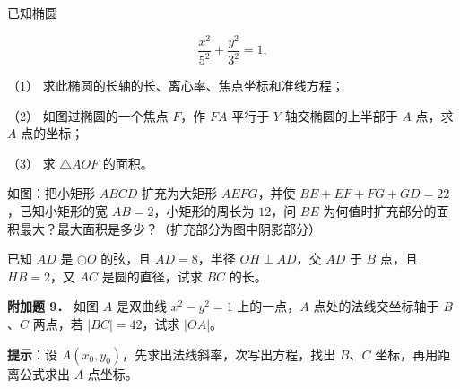 \begin{question}
已知椭圆

\nopagebreak[4]
\[
\frac{x^2}{5^2}+\frac{y^2}{3^2}=1,
\]

（1） 求此椭圆的长轴的长、离心率、焦点坐标和准线方程；

（2） 如图过椭圆的一个焦点 $F$，作 $FA$ 平行于 $Y$ 轴交椭圆的上半部于 $A$ 点，求 $A$ 点的坐标；
\nopagebreak[4]
\begin{center}\end{center}
\nopagebreak[4]
（3） 求 $\triangle AOF$ 的面积。

\Needspace{0.4\textheight}
\end{question}
\begin{question}
如图：把小矩形 $ABCD$ 扩充为大矩形 $AEFG$，并使 $BE+EF+FG+GD=22$，已知小矩形的宽 $AB=2$，小矩形的周长为 $12$，问 $BE$ 为何值时扩充部分的面积最大？最大面积是多少？（扩充部分为图中阴影部分）
\nopagebreak[4]
\begin{center}\end{center}
\nopagebreak[4]
\Needspace{0.4\textheight}
\end{question}
\begin{question}
已知 $AD$ 是 $\odot O$ 的弦，且 $AD=8$，半径 $OH\perp AD$，交 $AD$ 于 $B$ 点，且 $HB=2$，又 $AC$ 是圆的直径，试求 $BC$ 的长。
\nopagebreak[4]
\begin{center}\end{center}
\nopagebreak[4]
\textbf{附加题 9．} 如图 $A$ 是双曲线 $x^2-y^2=1$ 上的一点，$A$ 点处的法线交坐标轴于 $B$、$C$ 两点，若 $|BC|=42$，试求 $|OA|$。

\begin{gktip}
\textbf{提示}：设 $A(x_0,y_0)$，先求出法线斜率，次写出方程，找出 $B$、$C$ 坐标，再用距离公式求出 $A$ 点坐标。
\end{gktip}
\nopagebreak[4]
\begin{center}\end{center}
\nopagebreak[4]

\end{question}